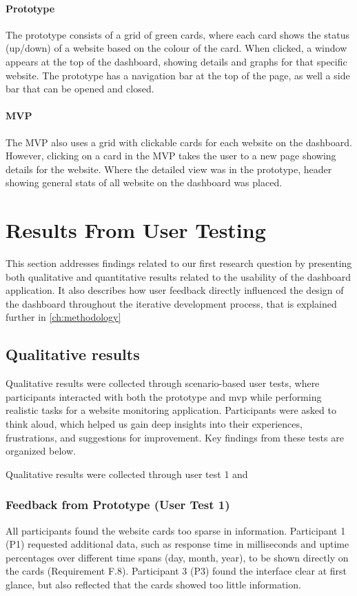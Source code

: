 \paragraph{Prototype}
The prototype consists of a grid of green cards, where each card shows the status (up/down) of a website based on the colour of the card. When clicked, a window appears at the top of the dashboard, showing details and graphs for that specific website. The prototype has a navigation bar at the top of the page, as well a side bar that can be opened and closed.

\paragraph{MVP}
The MVP also uses a grid with clickable cards for each website on the dashboard. However, clicking on a card in the MVP takes the user to a new page showing details for the website. Where the detailed view was in the prototype, header showing general stats of all website on the dashboard was placed.






\section{Results From User Testing}
\label{sec:user_test_results}
This section addresses findings related to our first research question by presenting both qualitative and quantitative results related to the usability of the dashboard application. It also describes how user feedback directly influenced the design of the dashboard throughout the iterative development process, that is explained further in \autoref{ch:methodology}

\subsection{Qualitative results}
Qualitative results were collected through scenario-based user tests, where participants interacted with both the prototype and \acrshort{mvp} while performing realistic tasks for a website monitoring application. Participants were asked to think aloud, which helped us gain deep insights into their experiences, frustrations, and suggestions for improvement. Key findings from these tests are organized below.

Qualitative results were collected through user test 1 and

\subsubsection{Feedback from Prototype (User Test 1)}  
All participants found the website cards too sparse in information. Participant 1 (P1) requested additional data, such as response time in milliseconds and uptime percentages over different time spans (day, month, year), to be shown directly on the cards (Requirement F.8). Participant 3 (P3) found the interface clear at first glance, but also reflected that the cards showed too little information. 

